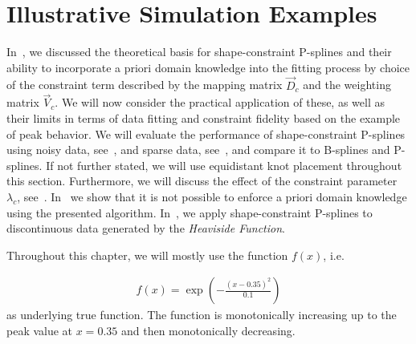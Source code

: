 \chapter{Illustrative Simulation Examples} \label{cha:practical-considerations}

In~, we discussed the theoretical basis for shape-constraint P-splines and their ability to incorporate a priori domain knowledge into the fitting process by choice of the constraint term described by the mapping matrix $\vec{D}_c$ and the weighting matrix $\vec{V}_c$. We will now consider the practical application of these, as well as their limits in terms of data fitting and constraint fidelity  based on the example of peak behavior. We will evaluate the performance of shape-constraint P-splines using noisy data, see~, and sparse data, see~, and compare it to B-splines and P-splines. If not further stated, we will use equidistant knot placement throughout this section. Furthermore, we will discuss the effect of the constraint parameter $\lambda_c$, see~. In~ we show that it is not possible to enforce a priori domain knowledge using the presented algorithm. In~, we apply shape-constraint P-splines to discontinuous data generated by the \emph{Heaviside Function}.

Throughout this chapter, we will mostly use the function $f(x)$, i.e.

\begin{align} \label{eq:true-func-peak}
	f(x) = \exp\left(-\frac{(x - 0.35)^2}{0.1} \right)
\end{align}
% 
as underlying true function. The function is monotonically increasing up to the peak value at $x = 0.35$ and then monotonically decreasing.  


